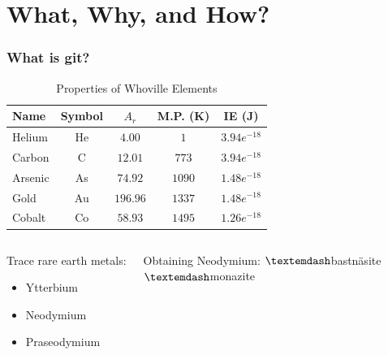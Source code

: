 \documentclass[unknownkeysallowed]{beamer}
\begin{document}
\section{What, Why, and How?}
\begin{frame}
    \frametitle{What is git?}

    \vspace{1cm} %
    \begin{table}[h]
    \centering
    \begin{tabular}{lcccc} \bottomrule[2pt]
        Name & Symbol & $A_r$ & M.P. (K) & IE (J) \\ \bottomrule
        Helium & He & $4.00$ & $1$ & $3.94e^{-18}$ \\
        Carbon & C & $12.01$ & $773$ & $3.94e^{-18}$ \\
        Arsenic & As & $74.92$ & $1090$ & $1.48e^{-18}$ \\
        Gold & Au & $196.96$ & $1337$ & $1.48e^{-18}$ \\
        Cobalt & Co & $58.93$ & $1495$ & $1.26e^{-18}$ \\
    \bottomrule[2pt]
    \end{tabular}
    \caption{Properties of Whoville Elements}
    \end{table}

    \vspace{-0.6cm} %

    \begin{columns}[t]
    \column{4.5cm}
    \begin{block}{Trace rare earth metals:}
    \begin{itemize}
        \item{Ytterbium}
        \item{Neodymium}
        \item{Praseodymium}
    \end{itemize}
    \end{block}
    \column{4.5cm}
    \begin{block}{Obtaining Neodymium:}
        \vspace{0.15cm}
        $\textemdash$bastn\"{a}site \\
        $\textemdash${monazite} \\
    \end{block}
    \end{columns}

\end{frame}
\end{document}
